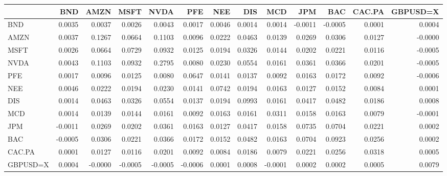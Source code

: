 \begin{tabular}{lrrrrrrrrrrrr}
\toprule
 & BND & AMZN & MSFT & NVDA & PFE & NEE & DIS & MCD & JPM & BAC & CAC.PA & GBPUSD=X \\
\midrule
BND & 0.0035 & 0.0037 & 0.0026 & 0.0043 & 0.0017 & 0.0046 & 0.0014 & 0.0014 & -0.0011 & -0.0005 & 0.0001 & 0.0004 \\
AMZN & 0.0037 & 0.1267 & 0.0664 & 0.1103 & 0.0096 & 0.0222 & 0.0463 & 0.0139 & 0.0269 & 0.0306 & 0.0127 & -0.0000 \\
MSFT & 0.0026 & 0.0664 & 0.0729 & 0.0932 & 0.0125 & 0.0194 & 0.0326 & 0.0144 & 0.0202 & 0.0221 & 0.0116 & -0.0005 \\
NVDA & 0.0043 & 0.1103 & 0.0932 & 0.2795 & 0.0080 & 0.0230 & 0.0554 & 0.0161 & 0.0361 & 0.0366 & 0.0201 & -0.0005 \\
PFE & 0.0017 & 0.0096 & 0.0125 & 0.0080 & 0.0647 & 0.0141 & 0.0137 & 0.0092 & 0.0163 & 0.0172 & 0.0092 & -0.0006 \\
NEE & 0.0046 & 0.0222 & 0.0194 & 0.0230 & 0.0141 & 0.0742 & 0.0194 & 0.0163 & 0.0127 & 0.0152 & 0.0084 & 0.0001 \\
DIS & 0.0014 & 0.0463 & 0.0326 & 0.0554 & 0.0137 & 0.0194 & 0.0993 & 0.0161 & 0.0417 & 0.0482 & 0.0186 & 0.0008 \\
MCD & 0.0014 & 0.0139 & 0.0144 & 0.0161 & 0.0092 & 0.0163 & 0.0161 & 0.0311 & 0.0158 & 0.0163 & 0.0079 & -0.0001 \\
JPM & -0.0011 & 0.0269 & 0.0202 & 0.0361 & 0.0163 & 0.0127 & 0.0417 & 0.0158 & 0.0735 & 0.0704 & 0.0221 & 0.0002 \\
BAC & -0.0005 & 0.0306 & 0.0221 & 0.0366 & 0.0172 & 0.0152 & 0.0482 & 0.0163 & 0.0704 & 0.0923 & 0.0256 & 0.0002 \\
CAC.PA & 0.0001 & 0.0127 & 0.0116 & 0.0201 & 0.0092 & 0.0084 & 0.0186 & 0.0079 & 0.0221 & 0.0256 & 0.0318 & 0.0005 \\
GBPUSD=X & 0.0004 & -0.0000 & -0.0005 & -0.0005 & -0.0006 & 0.0001 & 0.0008 & -0.0001 & 0.0002 & 0.0002 & 0.0005 & 0.0079 \\
\bottomrule
\end{tabular}
